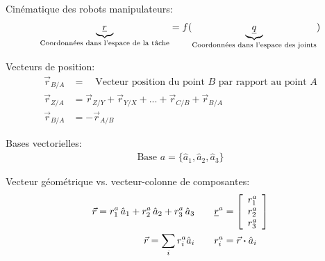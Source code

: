 Cinématique des robots manipulateurs:
\begin{align}
	\underbrace{
		\underline{r}
	}_{\text{Coordonnées dans l'espace de la tâche}}
	= f(
	\underbrace{
		\underline{q}
	}_{\text{Coordonnées dans l'espace des joints}}
	)
\end{align}

Vecteurs de position:
\begin{align}
	\vec{r}_{B/A}  &=  \quad \text{Vecteur position du point $B$ par rapport au point $A$} \\
	\vec{r}_{Z/A}  &=   \vec{r}_{Z/Y} + \vec{r}_{Y/X} + ... + \vec{r}_{C/B} + \vec{r}_{B/A}  \\
	\vec{r}_{B/A}  &= - \vec{r}_{A/B}
\end{align}

Bases vectorielles:
\begin{align}
	\text{Base } a = \{ \hat{a}_{1} , \hat{a}_{2} , \hat{a}_{3} \}
\end{align}

Vecteur géométrique vs. vecteur-colonne de composantes:
\begin{align}
	\vec{r} = r_1^a \, \hat{a}_{1} + r_2^a \, \hat{a}_{2} + r_3^a \, \hat{a}_{3}
	\quad & \quad
	\underline{r}^{a} = \left[ \begin{array}{c} r_1^a \\ r_2^a \\ r_3^a  \end{array} \right]  \\
	\vec{r} = \sum_{i} r_i^a \hat{a}_i
	\quad & \quad
	r_i^a = \vec{r} \boldsymbol{\cdot} \hat{a}_i
\end{align}

